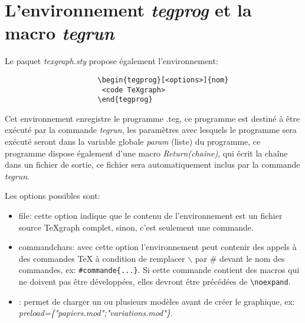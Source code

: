 \section{L'environnement \textit{tegprog} et la macro \textit{tegrun} }

Le paquet \textit{texgraph.sty} propose également l'environnement:
\begin{verbatim}
                      \begin{tegprog}[<options>]{nom}
                       <code TeXgraph>
                      \end{tegprog}
\end{verbatim}

Cet environnement enregistre le programme .teg, ce programme est destiné à être exécuté par la commande \textit{tegrun}, les paramètres avec lesquels le programme sera exécuté seront dans la variable globale \textit{param} (liste) du programme, ce programme dispose également d'une macro \textit{Return(chaîne)}, qui écrit la chaîne dans un fichier de sortie, ce fichier sera automatiquement inclus par la commande \textit{tegrun}.

Les options possibles sont:
\begin{itemize}
 \item \textcolor{\coloropt}{file}: cette option indique que le contenu de l'environnement est un fichier source TeXgraph complet, sinon, c'est seulement une commande.

 \item \textcolor{\coloropt}{commandchars}: avec cette option l'environnement peut contenir des appels à des commandes \TeX{} à condition de remplacer $\backslash$ par \# devant le nom des commandes, ex: \verb|#commande{...}|. Si cette commande contient des macros qui ne doivent pas être développées, elles devront être précédées de \verb|\noexpand|.

 \item {}: permet de charger un ou plusieurs modèles avant de créer le graphique, ex: \textit{preload=\{"papiers.mod";"variations.mod"\}}.
\end{itemize}

